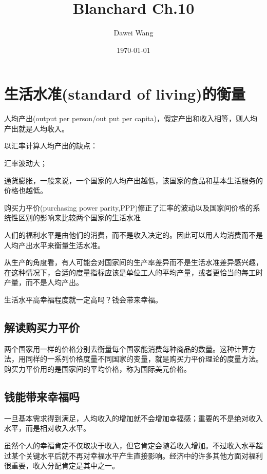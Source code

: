 \documentclass{article}
\title{Blanchard Ch.10}
\author{Dawei Wang}
\date{\today}
\begin{document}
	\maketitle
\section{生活水准(standard of living)的衡量}

人均产出(output per person/out put per capita)，假定产出和收入相等，则人均产出就是人均收入。

\hspace*{\fill}

以汇率计算人均产出的缺点：

汇率波动大；

通货膨胀，一般来说，一个国家的人均产出越低，该国家的食品和基本生活服务的价格也越低。

购买力平价(purchasing power parity,PPP)修正了汇率的波动以及国家间价格的系统性区别的影响来比较两个国家的生活水准

\hspace*{\fill}

人们的福利水平是由他们的消费，而不是收入决定的。因此可以用人均消费而不是人均产出水平来衡量生活水准。

从生产的角度看，有人可能会对国家间的生产率差异而不是生活水准差异感兴趣，在这种情况下，合适的度量指标应该是单位工人的平均产量，或者更恰当的每工时产量，而不是人均产出。

生活水平高幸福程度就一定高吗？钱会带来幸福。

\subsection{解读购买力平价}

两个国家用一样的价格分别去衡量每个国家能消费每种商品的数量。这种计算方法，用同样的一系列价格度量不同国家的变量，就是购买力平价理论的度量方法。购买力平价用的是国家间的平均价格，称为国际美元价格。

\subsection{钱能带来幸福吗}

一旦基本需求得到满足，人均收入的增加就不会增加幸福感；重要的不是绝对收入水平，而是相对收入水平。

虽然个人的幸福肯定不仅取决于收入，但它肯定会随着收入增加。不过收入水平超过某个关键水平后就不再对幸福水平产生直接影响。经济中的许多其他方面对福利很重要，收入分配肯定是其中之一。
\end{document}
